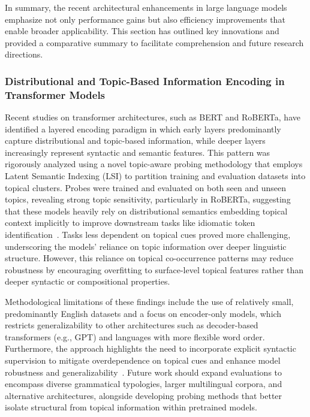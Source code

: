 \documentclass[sigconf]{acmart}
\begin{document}
In summary, the recent architectural enhancements in large language models emphasize not only performance gains but also efficiency improvements that enable broader applicability. This section has outlined key innovations and provided a comparative summary to facilitate comprehension and future research directions.

\subsubsection{Distributional and Topic-Based Information Encoding in Transformer Models}

Recent studies on transformer architectures, such as BERT and RoBERTa, have identified a layered encoding paradigm in which early layers predominantly capture distributional and topic-based information, while deeper layers increasingly represent syntactic and semantic features. This pattern was rigorously analyzed using a novel topic-aware probing methodology that employs Latent Semantic Indexing (LSI) to partition training and evaluation datasets into topical clusters. Probes were trained and evaluated on both seen and unseen topics, revealing strong topic sensitivity, particularly in RoBERTa, suggesting that these models heavily rely on distributional semantics embedding topical context implicitly to improve downstream tasks like idiomatic token identification~\cite{ref44}. Tasks less dependent on topical cues proved more challenging, underscoring the models’ reliance on topic information over deeper linguistic structure. However, this reliance on topical co-occurrence patterns may reduce robustness by encouraging overfitting to surface-level topical features rather than deeper syntactic or compositional properties.

Methodological limitations of these findings include the use of relatively small, predominantly English datasets and a focus on encoder-only models, which restricts generalizability to other architectures such as decoder-based transformers (e.g., GPT) and languages with more flexible word order. Furthermore, the approach highlights the need to incorporate explicit syntactic supervision to mitigate overdependence on topical cues and enhance model robustness and generalizability~\cite{ref44}. Future work should expand evaluations to encompass diverse grammatical typologies, larger multilingual corpora, and alternative architectures, alongside developing probing methods that better isolate structural from topical information within pretrained models.
\end{document}

